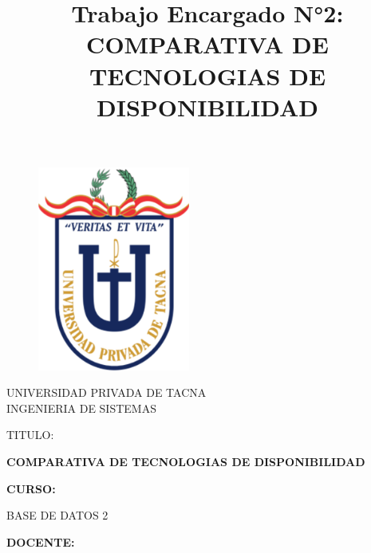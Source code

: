 \documentclass{article}
\begin{document}
\title{Trabajo Encargado N°2: COMPARATIVA DE TECNOLOGIAS DE DISPONIBILIDAD}
\begin{titlepage}
\begin{figure}[htb]
\begin{center}
\includegraphics[width=5cm]{logo.png}
\end{center}
\end{figure}
\vspace*{-0.25in}
\begin{center}
\large{UNIVERSIDAD PRIVADA DE TACNA}\\
\vspace*{-0.025in}
INGENIERIA DE SISTEMAS  \\

\vspace*{0.5in}
\begin{large}
TITULO:\\
\end{large}

\vspace*{0.1in}
\begin{Large}
\textbf{COMPARATIVA DE TECNOLOGIAS DE DISPONIBILIDAD} \\
\end{Large}

\vspace*{0.3in}
\begin{Large}
\textbf{CURSO:} \\
\end{Large}

\vspace*{0.1in}
\begin{large}
BASE DE DATOS 2\\
\end{large}

\vspace*{0.3in}
\begin{Large}
\textbf{DOCENTE:} \\
\end{Large}


\end{center}
\end{titlepage}
\end{document}
